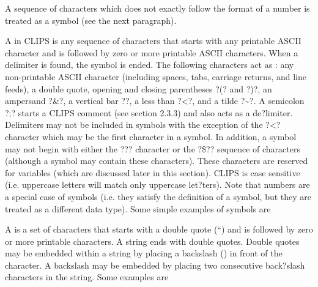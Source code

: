 \documentclass[letterpaper,10pt,english]{sphinxmanual}
\begin{document}
A sequence of characters which does not exactly follow the format of a
number is treated as a symbol (see the next paragraph).

A  in CLIPS is any sequence of characters that starts with any
printable ASCII character and is followed by zero or more printable
ASCII characters. When a delimiter is found, the symbol is ended. The
following characters act as : any non-printable ASCII
character (including spaces, tabs, carriage returns, and line feeds), a
double quote, opening and closing parentheses ?(? and ?)?, an ampersand
?\&?, a vertical bar ?\textbar{}?, a less than ?\textless{}?, and a tilde ?\textasciitilde{}?. A semicolon
?;? starts a CLIPS comment (see section 2.3.3) and also acts as a
de?limiter. Delimiters may not be included in symbols with the exception
of the ?\textless{}? character which may be the first character in a symbol. In
addition, a symbol may not begin with either the ??? character or the
?\$?? sequence of characters (although a symbol may contain these
characters). These characters are reserved for variables (which are
discussed later in this section). CLIPS is case sensitive (i.e.
uppercase letters will match only uppercase let?ters). Note that numbers
are a special case of symbols (i.e. they satisfy the definition of a
symbol, but they are treated as a different data type). Some simple
examples of symbols are

\begin{sphinxVerbatim}[commandchars=\\\{\}]
   

   
\end{sphinxVerbatim}

A  is a set of characters that starts with a double quote (“)
and is followed by zero or more printable characters. A string ends with
double quotes. Double quotes may be embedded within a string by placing
a backslash () in front of the character. A backslash may be embedded
by placing two consecutive back?slash characters in the string. Some
examples are

\begin{sphinxVerbatim}[commandchars=\\\{\}]
   
\end{sphinxVerbatim}
\end{document}
